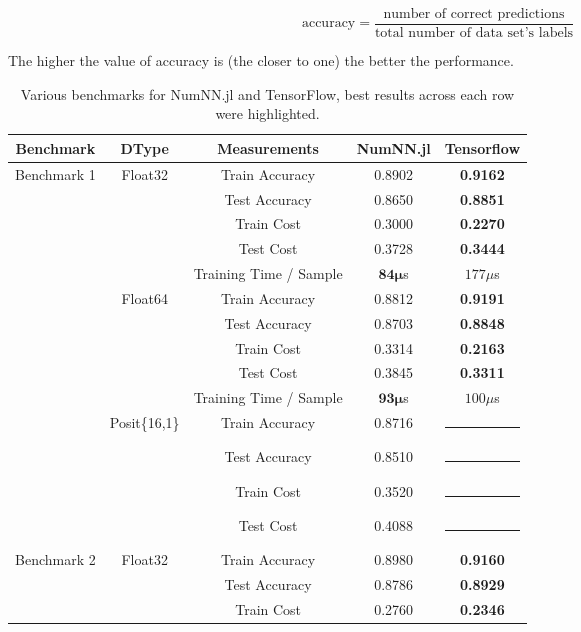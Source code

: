 \begin{equation}
\textrm{accuracy} = \frac{\textrm{number of correct predictions}}{\textrm{total number of data set's labels}}
\end{equation}

The higher the value of accuracy is (the closer to one) the better the performance.


\begin{table}[!htb]
	\centering
	\renewcommand{\arraystretch}{1.1}
	\caption{Various benchmarks for NumNN.jl and TensorFlow, best results across each row were highlighted.}\label{tab:bench}
	\begin{tabular}{|c | c | c || c | c |}
		\hline
		Benchmark & DType & Measurements & NumNN.jl & Tensorflow\\\hline\hline
		\multirow{14}{*}{Benchmark 1} & \multirow{5}{*}{Float32} & Train Accuracy & 0.8902 & \textbf{0.9162}\\
		& & Test Accuracy & 0.8650 & \textbf{0.8851}\\
		& & Train Cost & 0.3000 & \textbf{0.2270}\\
		& & Test Cost & 0.3728 & \textbf{0.3444}\\
		& & Training Time / Sample & \textbf{$\mathbf{84\mu}$}s  & $177\mu$s\\\cline{2-5}
		& \multirow{5}{*}{Float64} & Train Accuracy & 0.8812 & \textbf{0.9191} \\
		& & Test Accuracy & 0.8703 & \textbf{0.8848} \\
		& & Train Cost & 0.3314 & \textbf{0.2163} \\
		& & Test Cost & 0.3845 & \textbf{0.3311} \\
		& & Training Time / Sample & \textbf{$\mathbf{93\mu}$}s & $100\mu$s\\\cline{2-5}
		& \multirow{4}{*}{Posit\{16,1\}} & Train Accuracy & 0.8716 & \rule{5em}{1pt} \\
		& & Test Accuracy & 0.8510 & \rule{5em}{1pt} \\
		& & Train Cost & 0.3520 & \rule{5em}{1pt} \\
		& & Test Cost & 0.4088 & \rule{5em}{1pt} \\\hline
		\multirow{14}{*}{Benchmark 2\footref{batchnorm}} & \multirow{5}{*}{Float32} & Train Accuracy & 0.8980 & \textbf{0.9160}\\
		& & Test Accuracy & 0.8786 & \textbf{0.8929}\\
		& & Train Cost & 0.2760 & \textbf{0.2346}\\

\end{tabular}
\end{table}
